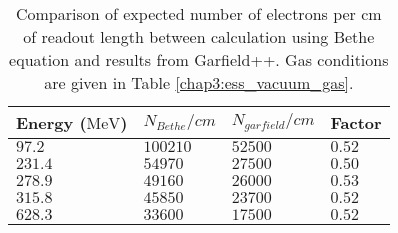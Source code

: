 \begin{table}[ht]%
	\centering
	\caption[Comparison of expected number of electrons per $\mathrm{cm}$ between calculation using Bethe equation and results from Garfield++]
	{Comparison of expected number of electrons per $\mathrm{cm}$ of readout length between calculation using Bethe equation and results from Garfield++. Gas conditions are given in Table \ref{chap3:ess_vacuum_gas}.}
	\label{chap3:GarfieldBethe}
	\begin{tabularx}{\linewidth}{XXXX}
		\toprule
		Energy ($\mathrm{MeV}$) & \(N_{Bethe}/cm\) & \(N_{garfield}/cm\) & Factor   \\
		\midrule
		\(97.2\)                & \(100210\)       & \(52500\)           & \(0.52\) \\
		\(231.4\)               & \(54970\)        & \(27500\)           & \(0.50\) \\
		\(278.9\)               & \(49160\)        & \(26000\)           & \(0.53\) \\
		\(315.8\)               & \(45850\)        & \(23700\)           & \(0.52\) \\
		\(628.3\)               & \(33600\)        & \(17500\)           & \(0.52\) \\
		\bottomrule
	\end{tabularx}
\end{table}